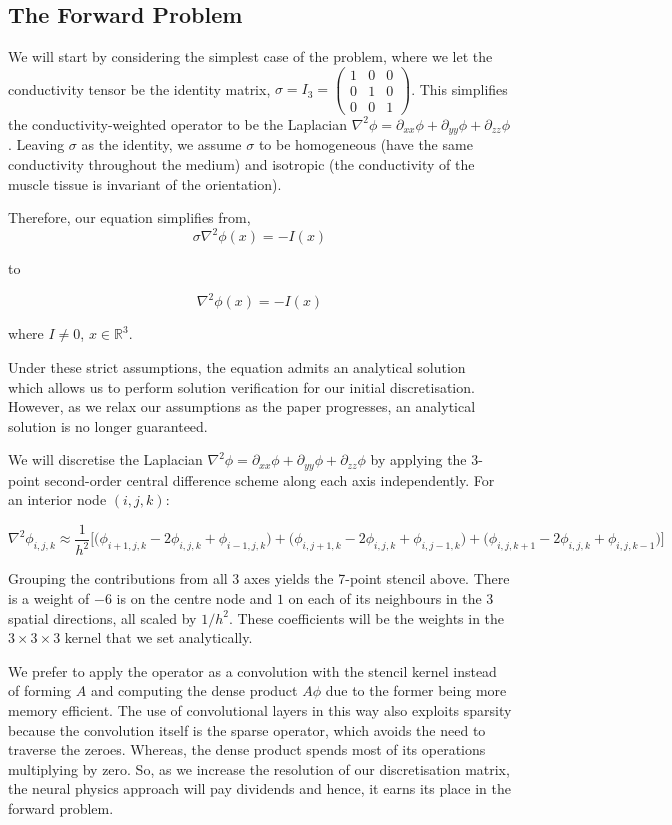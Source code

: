\documentclass[project-plan]{report-template}
\begin{document}
\subsection{The Forward Problem}
We will start by considering the simplest case of the problem, where we let the conductivity tensor be the identity matrix, $\sigma = I_3 = \begin{pmatrix} 1 & 0 & 0 \\ 0 & 1 & 0 \\ 0 & 0 & 1 \end{pmatrix}$. This simplifies the conductivity-weighted operator to be the Laplacian $\nabla^2 \phi = \partial_{xx}\phi + \partial_{yy}\phi + \partial_{zz}\phi$. Leaving $\sigma$ as the identity, we assume $\sigma$ to be homogeneous (have the same conductivity throughout the medium) and isotropic (the conductivity of the muscle tissue is invariant of the orientation).

Therefore, our equation simplifies from,
$$
\sigma \nabla^2 \phi(x) = -I(x)
$$

to

$$
\nabla^2 \phi(x) = -I(x)
$$

where $I \neq 0$, $x \in \mathbb{R}^3$.

Under these strict assumptions, the equation admits an analytical solution~\cite{mesin2013} which allows us to perform solution verification for our initial discretisation. However, as we relax our assumptions as the paper progresses, an analytical solution is no longer guaranteed.

We will discretise the Laplacian $\nabla^2 \phi = \partial_{xx}\phi + \partial_{yy}\phi + \partial_{zz}\phi$ by applying the 3-point second-order central difference scheme along each axis independently.  For an interior node $(i, j, k)$:

$$
\nabla^2 \phi_{i,j,k} \approx \frac{1}{h^2}\Big[\big(\phi_{i+1,j,k} - 2\phi_{i,j,k} + \phi_{i-1,j,k}\big) + \big(\phi_{i,j+1,k} - 2\phi_{i,j,k} + \phi_{i,j-1,k}\big) + \big(\phi_{i,j,k+1} - 2\phi_{i,j,k} + \phi_{i,j,k-1}\big)\Big]
$$

Grouping the contributions from all 3 axes yields the 7-point stencil above. There is a weight of $-6$ is on the centre node and $1$ on each of its neighbours in the 3 spatial directions, all scaled by $1/h^2$. These coefficients will be the weights in the $3 \times 3 \times 3$ kernel that we set analytically.~\cite{chen2026}

We prefer to apply the operator as a convolution with the stencil kernel instead of forming $A$ and computing the dense product $A\phi$ due to the former being more memory efficient. The use of convolutional layers in this way also exploits sparsity because the convolution itself is the sparse operator, which avoids the need to traverse the zeroes. Whereas, the dense product spends most of its operations multiplying by zero. So, as we increase the resolution of our discretisation matrix, the neural physics approach will pay dividends and hence, it earns its place in the forward problem.
\end{document}
